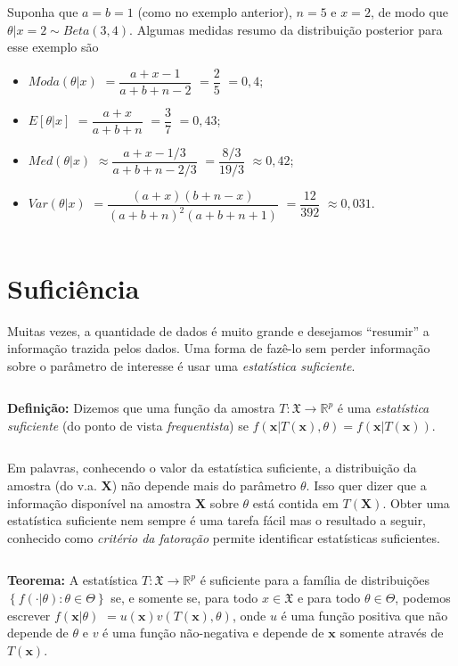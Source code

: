 \documentclass[
]{book}
\begin{document}
\(~\)

Suponha que \(a=b=1\) (como no exemplo anterior), \(n=5\) e \(x=2\), de modo que \(\theta|x=2 \sim Beta(3,4)\). Algumas medidas resumo da distribuição posterior para esse exemplo são

\begin{itemize}
\item
  \(Moda(\theta|x)\) \(=\dfrac{a+x-1}{a+b+n-2}\) \(=\dfrac{2}{5}\) \(=0,4\);
\item
  \(E[\theta|x]\) \(=\dfrac{a+x}{a+b+n}\) \(=\dfrac{3}{7}\) \(=0,43\);
\item
  \(Med(\theta|x)\) \(\approx \dfrac{a+x-1/3}{a+b+n-2/3}\) \(=\dfrac{8/3}{19/3}\) \(\approx 0,42\);
\item
  \(Var(\theta|x)\) \(=\dfrac{(a+x)(b+n-x)}{(a+b+n)^2(a+b+n+1)}\) \(=\dfrac{12}{392}\) \(\approx 0,031\).
\end{itemize}

\(~\)

\hypertarget{suficiuxeancia}{%
\section{Suficiência}\label{suficiuxeancia}}

Muitas vezes, a quantidade de dados é muito grande e desejamos ``resumir'' a informação trazida pelos dados. Uma forma de fazê-lo sem perder informação sobre o parâmetro de interesse é usar uma \emph{estatística suficiente}.

\(~\)

\textbf{Definição:} Dizemos que uma função da amostra \(T:\mathfrak{X} \rightarrow \mathbb{R}^p\) é uma \emph{estatística suficiente} (do ponto de vista \emph{frequentista}) se \(f\left(\boldsymbol x | T(\boldsymbol x),\theta\right) = f\left(\boldsymbol x | T(\boldsymbol x)\right)\).

\(~\)

Em palavras, conhecendo o valor da estatística suficiente, a distribuição da amostra (do v.a. \(\boldsymbol X\)) não depende mais do parâmetro \(\theta\). Isso quer dizer que a informação disponível na amostra \(\boldsymbol X\) sobre \(\theta\) está contida em \(T(\boldsymbol X)\). Obter uma estatística suficiente nem sempre é uma tarefa fácil mas o resultado a seguir, conhecido como \emph{critério da fatoração} permite identificar estatísticas suficientes.

\(~\)

\textbf{Teorema:} A estatística \(T:\mathfrak{X} \rightarrow \mathbb{R}^p\) é suficiente para a família de distribuições \(\left\{f(\cdot|\theta):\theta \in \Theta\right\}\) se, e somente se, para todo \(x \in \mathfrak{X}\) e para todo \(\theta \in \Theta\), podemos escrever \(f\left(\boldsymbol x | \theta\right)\) \(= u(\boldsymbol x) v\left(T(\boldsymbol x),\theta\right)\), onde \(u\) é uma função positiva que não depende de \(\theta\) e \(v\) é uma função não-negativa e depende de \(\boldsymbol x\) somente através de \(T(\boldsymbol x)\).
\end{document}
